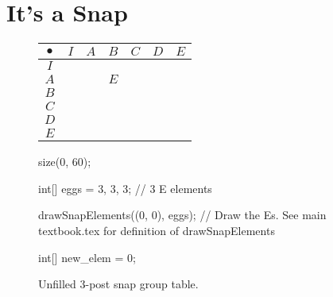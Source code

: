 \documentclass[../key.tex]{subfiles}
\begin{document}
\section{It's a Snap}

\newcommand\snap{\bullet}

\begin{figure}[h]
	\begin{center}
		\begin{minipage}[b]{\textwidth}
			\centering
			\begin{tabular}{c|cccccc}
				\hline
				$\snap$ & $I$ & $A$ & $B$ & $C$ & $D$ & $E$ \\ \hline
				\rowcolor{light-gray}
				$I$    &   &   &   &   &   &   \\
				$A$    &   &   & $E$ &   &   &   \\
				\rowcolor{light-gray}
				$B$    &   &   &   &   &   &   \\
				$C$    &   &   &   &   &   &   \\
				\rowcolor{light-gray}
				$D$    &   &   &   &   &   &   \\
				$E$    &   &   &   &   &   &   \\ \hline
			\end{tabular}
			\vspace*{0.5\baselineskip}
		\end{minipage}
	\end{center}
	\vspace*{-2\baselineskip}
	\begin{center}
		\begin{minipage}[t]{\textwidth}
			\caption{Unfilled $3$-post snap group table.}
			\label{fig:sbstable_CHANG}
		\end{minipage}
	\end{center}

	\begin{center}
		\begin{minipage}[b]{.45\textwidth}
			\centering
			\begin{asy}
				size(0, 60);

				int[] eggs = {3, 3, 3}; // 3 E elements

				drawSnapElements((0, 0), eggs); // Draw the Es. See main textbook.tex for definition of drawSnapElements

				int[] new_elem = {0};


\end{asy}
\end{minipage}
\end{center}
\end{figure}
\end{document}
